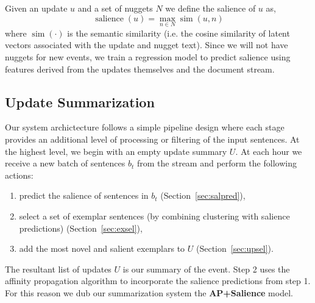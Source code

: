 Given an update $u$ and a set of nuggets $N$ we define the salience of 
$u$ as,
\[\operatorname{salience}(u) = \operatorname{max}_{n \in N} 
\operatorname{sim}(u, n) \]
where $\operatorname{sim}(\cdot)$ is the semantic similarity \cite{?} (i.e.
the cosine similarity of latent vectors associated with the update and 
nugget text). Since we will not have nuggets for new events, we train
a regression model to predict salience using features derived from 
the updates themselves
and the document stream.



\subsection{Update Summarization}

Our system archictecture follows a simple pipeline design where each
stage provides an additional level of processing or filtering of the input
sentences.
At the highest level, we begin with an empty update summary $U$.
At each hour we receive a new batch of sentences $b_t$ from the stream
and perform the following actions:
\begin{enumerate}
    \item predict the salience of sentences in $b_t$ (Section~\ref{sec:salpred}),
  \item select a set of exemplar sentences (by combining clustering with 
      salience predictions) (Section~\ref{sec:exsel}),
  \item add the most novel and salient exemplars to $U$ (Section~\ref{sec:upsel}).
\end{enumerate}

The resultant list of updates $U$ is our summary of the event.
Step 2 uses the affinity propagation algorithm to incorporate the salience
predictions from step 1. For this reason we dub our summarization 
system the \textbf{AP+Salience} model.



